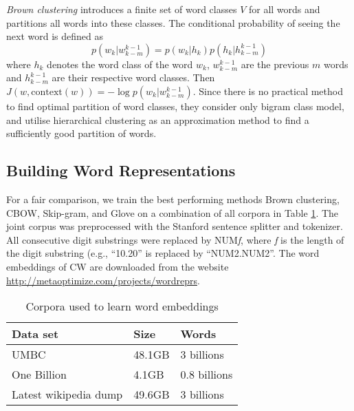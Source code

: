 \textit{Brown clustering} introduces a finite set of word classes $V$ for all words and partitions all words into these classes. The conditional probability of seeing the next word is defined as
\begin{equation}
p(w_k | w_{k - m}^{k -1}) = p(w_k | h_k) p(h_k | h_{k - m}^{k -1})
\end{equation}
where $h_k$ denotes the word class of the word $w_k$, $w_{k - m}^{k -1}$ are the previous $m$ words and $h_{k - m}^{k -1}$ are their respective word classes. Then $J(w, \text{context}(w)) = - \log p(w_k | w_{k - m}^{k -1}) $. Since there is no practical method to find optimal partition of word classes, they consider only bigram class model, and utilise hierarchical clustering as an approximation method to find a sufficiently good partition of words. 

\subsection{Building Word Representations}
For a fair comparison, we train the best performing methods Brown clustering, CBOW, Skip-gram, and Glove on a combination of all corpora in Table \ref{wordEmbedCorpora}. The joint corpus was preprocessed with the Stanford sentence splitter and tokenizer. All consecutive digit substrings were replaced by NUM\textit{f}, where \textit{f} is the length of the digit substring (e.g., ``10.20'' is replaced by ``NUM2.NUM2''. The word embeddings of CW are downloaded from the website \url{http://metaoptimize.com/projects/wordreprs}.

\begin{table}[h]
\begin{center}
\begin{small}
\begin{tabular}{lll}
\hline
\textbf{Data set} & \textbf{Size} & \textbf{Words} \\ \hline
UMBC 	& 48.1GB & 3 billions \\
One Billion 	& 4.1GB & 0.8 billions  \\
Latest wikipedia dump & 49.6GB & 3 billions \\ \hline
\end{tabular}
\end{small}
\caption{Corpora used to learn word embeddings}
\label{wordEmbedCorpora}
\end{center}
\end{table}

